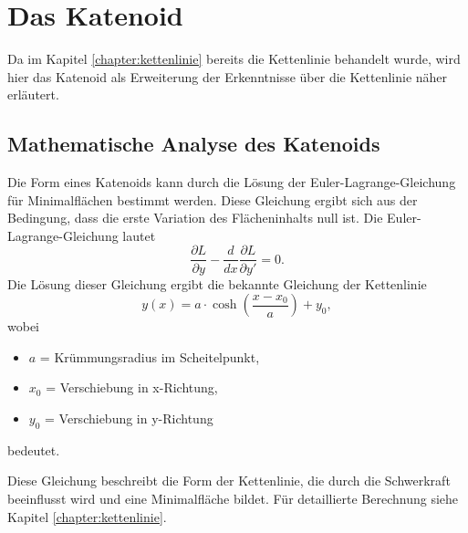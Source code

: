 %
%
%
%
\section{Das Katenoid
	\label{minimalflaechen:section:Das Katenoid}}
Da im Kapitel \ref{chapter:kettenlinie} bereits die Kettenlinie behandelt wurde, wird hier das Katenoid als Erweiterung der Erkenntnisse über die Kettenlinie näher erläutert. 

\subsection{Mathematische Analyse des Katenoids
	\label{Das Katenoid:subsection:Mathematische Analyse des Katenoids}}
Die Form eines Katenoids kann durch die Lösung der Euler-Lagrange-Gleichung für Minimalflächen bestimmt werden.
Diese Gleichung ergibt sich aus der Bedingung, dass die erste Variation des Flächeninhalts null ist.
Die Euler-Lagrange-Gleichung lautet
\begin{equation}
	\frac{\partial L}{\partial y} - \frac{d}{dx} \frac{\partial L}{\partial y'} = 0.
\end{equation}
%
Die Lösung dieser Gleichung ergibt die bekannte Gleichung der Kettenlinie
\begin{equation}
	y(x) = a \cdot \cosh \left( \frac{x - x_0}{a} \right) + y_0,
\end{equation}
%
wobei
\begin{itemize}
	\item \(a\) = Krümmungsradius im Scheitelpunkt,
	\item \(x_0\) = Verschiebung in x-Richtung,
	\item \(y_0\) = Verschiebung in y-Richtung
\end{itemize}
bedeutet.

Diese Gleichung beschreibt die Form der Kettenlinie, die durch die Schwerkraft beeinflusst wird und eine Minimalfläche bildet.
Für detaillierte Berechnung siehe Kapitel \ref{chapter:kettenlinie}.
